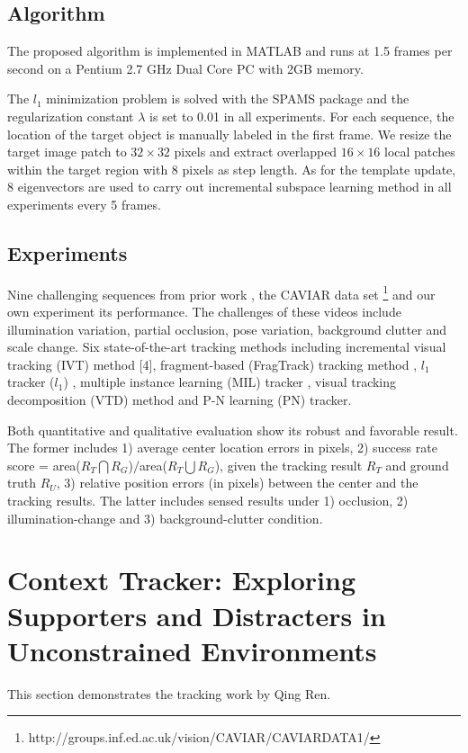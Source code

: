 \documentclass{article}
\begin{document}
\subsection{Algorithm}
The proposed algorithm is implemented in MATLAB and runs at 1.5 frames per second on a Pentium 2.7 GHz Dual Core PC with 2GB memory.

The $l_1$ minimization problem is solved with the SPAMS package and the regularization constant $\lambda$ is set to 0.01 in all experiments. For each sequence, the location of the target object is manually labeled in the first frame. We resize the target image patch to $32\times 32$ pixels and extract overlapped $16\times16$ local patches within the target region with 8 pixels as step length. As for the template update, 8 eigenvectors are used to carry out incremental subspace learning method in all experiments every 5 frames.
\subsection{Experiments}
\label{sec:asla_section}
Nine challenging sequences from prior work \cite{shi1,shi2,shi3,shi4,shi5}, the CAVIAR data set \footnote{http://groups.inf.ed.ac.uk/vision/CAVIAR/CAVIARDATA1/} and our own experiment its performance. The challenges of these videos include illumination variation, partial occlusion, pose variation, background clutter and scale change. Six state-of-the-art tracking methods including incremental visual tracking (IVT) method [4], fragment-based (FragTrack) tracking method \cite{shi1}, $l_1$ tracker ($l_1$) \cite{shi6}, multiple instance learning (MIL) tracker \cite{shi2}, visual tracking decomposition (VTD) method \cite{shi3} and P-N learning (PN) tracker. \cite{shi7}

Both quantitative and qualitative evaluation show its robust and favorable result. The former includes 1) average center location errors in pixels, 2)
success rate score = area($R_T \bigcap R_G$)$/$area($R_T \bigcup R_G$), given the tracking result $R_T$ and ground truth $R_U$, 3) relative position errors (in pixels) between the center and the tracking results. The latter includes sensed results under 1) occlusion, 2) illumination-change and 3) background-clutter condition.

\section{Context Tracker: Exploring Supporters and Distracters in Unconstrained Environments}
This section demonstrates the tracking work by Qing Ren.
\end{document}
